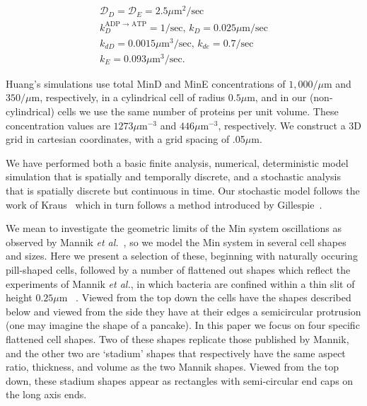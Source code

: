 \documentclass[letterpaper,twocolumn,amsmath,amssymb,pre]{revtex4-1}
\newcommand\micron{\ensuremath{\mu\text{m}}}
\begin{document}
\begin{gather*}
  \mathcal{D}_D = \mathcal{D}_{E} = 2.5\micron^2/\text{sec}\\
  k_D^{\textrm{ADP $\rightarrow$ ATP}} = 1/\textrm{sec,  }
  k_D = 0.025 \micron /\textrm{sec}\\
  k_{dD} = 0.0015 \micron^3/ \textrm{sec,  }
  k_{de} = 0.7/\textrm{sec}\\
  k_E = 0.093 \micron^3 /\textrm{sec}.
\end{gather*}

Huang's simulations use total MinD and MinE concentrations of
$1,000/\micron$ and $350/\micron$, respectively, in a cylindrical cell
of radius $0.5\micron$, and in our (non-cylindrical) cells we use the
same number of proteins per unit volume.  These concentration values
are $1273\micron^{-3}$ and $446\micron^{-3}$, respectively. We
construct a 3D grid in cartesian coordinates, with a grid spacing of
.05\micron.

We have performed both a basic finite analysis, numerical,
deterministic model simulation that is spatially and temporally
discrete, and a stochastic analysis that is spatially discrete but
continuous in time.  Our stochastic model follows the work of
Kraus~\cite{kraus1996crosstalk} which in turn follows a method
introduced by Gillespie~\cite{gillespie1977exact}.

We mean to investigate the geometric limits of the Min system
oscillations as observed by Mannik \emph{et
  al.}~\cite{mannik2012robustness}, so we model the Min system in
several cell shapes and sizes.  Here we present a selection of these,
beginning with naturally occuring pill-shaped cells, followed by a
number of flattened out shapes which reflect the experiments of Mannik
\emph{et al.}, in which bacteria are confined within a thin slit of
height $0.25\micron$ ~\cite{mannik2012robustness}.  Viewed from the
top down the cells have the shapes described below and viewed from the
side they have at their edges a semicircular protrusion (one may
imagine the shape of a pancake).
%
In this paper we focus on four specific flattened cell shapes.  Two of
these shapes replicate those published by Mannik, and the other two
are `stadium' shapes that respectively have the same aspect ratio,
thickness, and volume as the two Mannik shapes.  Viewed from the top
down, these stadium shapes appear as rectangles with semi-circular end
caps on the long axis ends.

\end{document}
